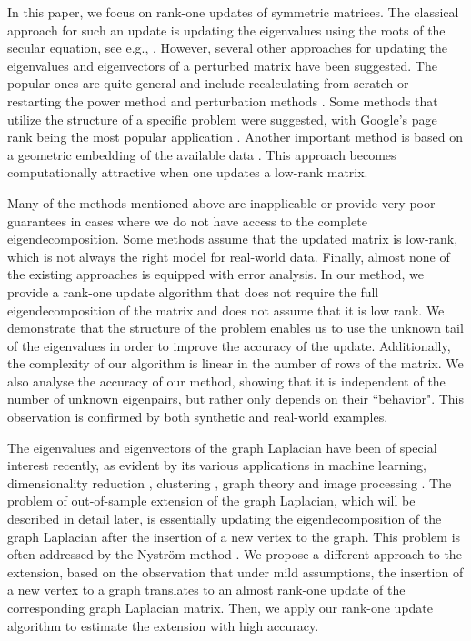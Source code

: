 \documentclass[11pt]{article}
\begin{document}
In this paper, we focus on rank-one updates of symmetric matrices. The classical approach for such an update is updating the eigenvalues using the roots of the secular equation, see e.g., \cite{bunch1978rank}. However, several other approaches for updating the eigenvalues and eigenvectors of a perturbed matrix have been suggested. The popular ones are quite general and include recalculating from scratch or restarting the power method \cite{langville2006updating} and perturbation methods \cite{stewart1990matrix}. Some methods that utilize the structure of a specific problem were suggested, with Google's page rank being the most popular application \cite[Chapter~10]{langville2011google}. Another important method is based on a geometric embedding of the available data \cite{brand2006fast}. This approach becomes computationally attractive when one updates a low-rank matrix. 

Many of the methods mentioned above are inapplicable or provide very poor guarantees in cases where we do not have access to the complete eigendecomposition. Some methods assume that the updated matrix is low-rank, which is not always the right model for real-world data. Finally, almost none of the existing approaches is equipped with  error analysis. In our method, we provide a rank-one update algorithm that does not require the full eigendecomposition of the matrix and does not assume that it is low rank. We demonstrate that the structure of the problem enables us to use the unknown tail of the eigenvalues in order to improve the accuracy of the update. Additionally, the complexity of our algorithm is linear in the number of rows of the matrix. We also analyse the accuracy of our method, showing that it is independent of the number of unknown eigenpairs, but rather only depends on their ``behavior". This observation  is confirmed by both synthetic and real-world examples.

The eigenvalues and eigenvectors of the graph Laplacian have been of special interest recently, as evident by its various applications in machine learning, dimensionality reduction \cite{belkin2003laplacian, coifman2006diffusion}, clustering \cite{ng2002spectral, von2007tutorial}, graph theory \cite{chung1997spectral} and image processing \cite{coifman2008graph}. The problem of out-of-sample extension of the graph Laplacian, which will be described in detail later, is essentially updating the eigendecomposition of the graph Laplacian after the insertion of a new vertex to the graph. This problem is often addressed by the Nystr{\"o}m method \cite{bengio2004out}. We propose a different approach to the extension, based on the observation that under mild assumptions, the insertion of a new vertex to a graph translates to an almost rank-one update of the corresponding graph Laplacian matrix. Then, we apply our rank-one update algorithm to estimate the extension with high accuracy.
\end{document}
